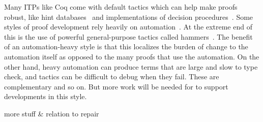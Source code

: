 Many ITPs like Coq come with default tactics which can
help make proofs robust, like hint databases~\cite{coq-intro} and implementations of decision procedures~\cite{Pugh1991}. 
Some styles of proof development rely heavily on automation~\cite{Chlipala:2013:CPD:2584504}.
At the extreme end of this is the use of powerful general-purpose tactics 
called hammers~\cite{Blanchette2016b, Blanchette2013, Kaliszyk2014, Czajka2018}.
The benefit of an automation-heavy style is that this localizes the burden of change to the automation itself as opposed 
to the many proofs that use the automation.
On the other hand, heavy automation can produce terms that are large and slow to type check,
and tactics can be difficult to debug when they fail.
These are complementary and so on.
But more work will be needed for \toolname to support developments in this style.

more stuff \& relation to repair




